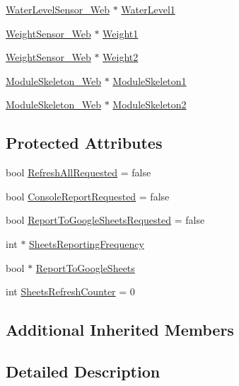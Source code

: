 \begin{DoxyCompactItemize}
\item 
\hyperlink{class_water_level_sensor___web}{Water\+Level\+Sensor\+\_\+\+Web} $\ast$ \hyperlink{class_grow_box_a59c79308af69a11ab4e3875679af73cd}{Water\+Level1}
\item 
\hyperlink{class_weight_sensor___web}{Weight\+Sensor\+\_\+\+Web} $\ast$ \hyperlink{class_grow_box_aceb1416333b51cdde29c05cd9bc4564a}{Weight1}
\item 
\hyperlink{class_weight_sensor___web}{Weight\+Sensor\+\_\+\+Web} $\ast$ \hyperlink{class_grow_box_a521e1b41c7a71bc44746c8dd1ab63476}{Weight2}
\item 
\hyperlink{class_module_skeleton___web}{Module\+Skeleton\+\_\+\+Web} $\ast$ \hyperlink{class_grow_box_a86e43adbb636d95597cea22666ca87e2}{Module\+Skeleton1}
\item 
\hyperlink{class_module_skeleton___web}{Module\+Skeleton\+\_\+\+Web} $\ast$ \hyperlink{class_grow_box_af2699e6867ce4f138e7ae2139b079b20}{Module\+Skeleton2}
\end{DoxyCompactItemize}
\subsection*{Protected Attributes}
\begin{DoxyCompactItemize}
\item 
bool \hyperlink{class_grow_box_a7f3cd6990537a64901739ea4677693f8}{Refresh\+All\+Requested} = false
\item 
bool \hyperlink{class_grow_box_aef5b0e1a50bdc88a89b84c8106e65df2}{Console\+Report\+Requested} = false
\item 
bool \hyperlink{class_grow_box_a493810d3abe51e6e534d5966aaf6cf64}{Report\+To\+Google\+Sheets\+Requested} = false
\item 
int $\ast$ \hyperlink{class_grow_box_a6e55aab15df9681e8bf5e0e3e22d7ffa}{Sheets\+Reporting\+Frequency}
\item 
bool $\ast$ \hyperlink{class_grow_box_a6c689134f2556a744038a1c8075dcec8}{Report\+To\+Google\+Sheets}
\item 
int \hyperlink{class_grow_box_a21439bf3f72010ffa8c419cd931abd1d}{Sheets\+Refresh\+Counter} = 0
\end{DoxyCompactItemize}
\subsection*{Additional Inherited Members}


\subsection{Detailed Description}


